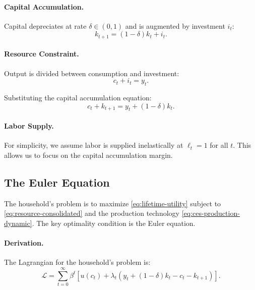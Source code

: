 \paragraph{Capital Accumulation.}
Capital depreciates at rate $\delta \in (0,1)$ and is augmented by investment $i_t$:
\begin{equation}
k_{t+1} = (1-\delta) k_t + i_t.
\label{eq:capital-accumulation}
\end{equation}

\paragraph{Resource Constraint.}
Output is divided between consumption and investment:
\begin{equation}
c_t + i_t = y_t.
\label{eq:resource-constraint}
\end{equation}

Substituting the capital accumulation equation:
\begin{equation}
c_t + k_{t+1} = y_t + (1-\delta) k_t.
\label{eq:resource-consolidated}
\end{equation}

\paragraph{Labor Supply.}
For simplicity, we assume labor is supplied inelastically at $\ell_t = 1$ for all $t$. This allows us to focus on the capital accumulation margin.

\subsection{The Euler Equation}
\label{subsec:euler-equation}

The household's problem is to maximize \cref{eq:lifetime-utility} subject to \cref{eq:resource-consolidated} and the production technology \cref{eq:ces-production-dynamic}. The key optimality condition is the Euler equation.

\paragraph{Derivation.}
The Lagrangian for the household's problem is:
\begin{equation}
\mathcal{L} = \sum_{t=0}^{\infty} \beta^t \left[ u(c_t) + \lambda_t \left( y_t + (1-\delta) k_t - c_t - k_{t+1} \right) \right].
\label{eq:lagrangian-dynamic}
\end{equation}

